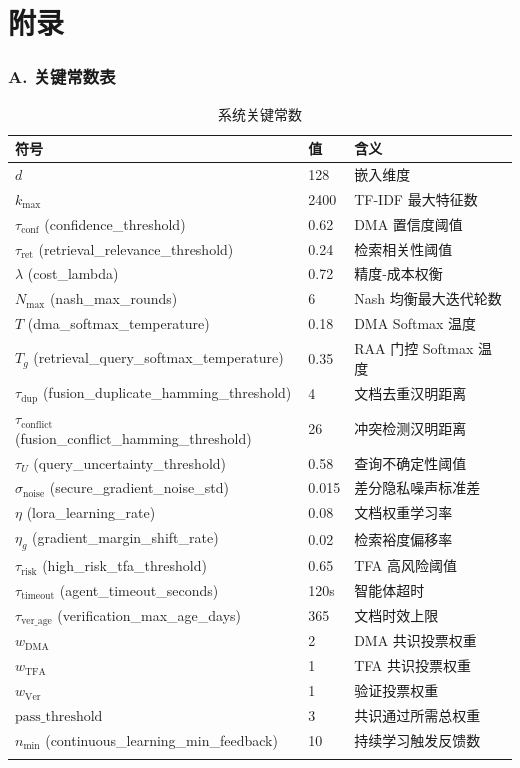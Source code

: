 \documentclass[11pt,a4paper]{ctexart}
\theoremstyle{remark}
\begin{document}
\part*{附录}

\section*{A. 关键常数表}

\begin{longtable}{lll}
\toprule
\textbf{符号} & \textbf{值} & \textbf{含义} \\
\midrule
$d$ & 128 & 嵌入维度 \\
$k_{\max}$ & 2400 & TF-IDF 最大特征数 \\
$\tau_{\text{conf}}$ (confidence\_threshold) & 0.62 & DMA 置信度阈值 \\
$\tau_{\text{ret}}$ (retrieval\_relevance\_threshold) & 0.24 & 检索相关性阈值 \\
$\lambda$ (cost\_lambda) & 0.72 & 精度-成本权衡 \\
$N_{\max}$ (nash\_max\_rounds) & 6 & Nash 均衡最大迭代轮数 \\
$T$ (dma\_softmax\_temperature) & 0.18 & DMA Softmax 温度 \\
$T_g$ (retrieval\_query\_softmax\_temperature) & 0.35 & RAA 门控 Softmax 温度 \\
$\tau_{\text{dup}}$ (fusion\_duplicate\_hamming\_threshold) & 4 & 文档去重汉明距离 \\
$\tau_{\text{conflict}}$ (fusion\_conflict\_hamming\_threshold) & 26 & 冲突检测汉明距离 \\
$\tau_U$ (query\_uncertainty\_threshold) & 0.58 & 查询不确定性阈值 \\
$\sigma_{\text{noise}}$ (secure\_gradient\_noise\_std) & 0.015 & 差分隐私噪声标准差 \\
$\eta$ (lora\_learning\_rate) & 0.08 & 文档权重学习率 \\
$\eta_g$ (gradient\_margin\_shift\_rate) & 0.02 & 检索裕度偏移率 \\
$\tau_{\text{risk}}$ (high\_risk\_tfa\_threshold) & 0.65 & TFA 高风险阈值 \\
$\tau_{\text{timeout}}$ (agent\_timeout\_seconds) & 120s & 智能体超时 \\
$\tau_{\text{ver\_age}}$ (verification\_max\_age\_days) & 365 & 文档时效上限 \\
$w_{\text{DMA}}$ & 2 & DMA 共识投票权重 \\
$w_{\text{TFA}}$ & 1 & TFA 共识投票权重 \\
$w_{\text{Ver}}$ & 1 & 验证投票权重 \\
$\text{pass\_threshold}$ & 3 & 共识通过所需总权重 \\
$n_{\min}$ (continuous\_learning\_min\_feedback) & 10 & 持续学习触发反馈数 \\
\bottomrule
\caption{系统关键常数}
\end{longtable}
\end{document}
